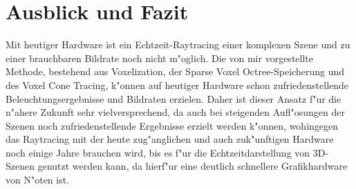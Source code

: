 \documentclass[a4paper, 12pt]{scrartcl}
\begin{document}
\section{Ausblick und Fazit}
Mit heutiger Hardware ist ein Echtzeit-Raytracing einer komplexen Szene und zu einer brauchbaren Bildrate noch nicht m"oglich. Die von mir vorgestellte Methode, bestehend aus Voxelization, der Sparse Voxel Octree-Speicherung und des Voxel Cone Tracing, k"onnen auf heutiger Hardware schon zufriedenstellende Beleuchtungsergebnisse und Bildraten erzielen. 
Daher ist dieser Ansatz f"ur die n"ahere Zukunft sehr vielversprechend, da auch bei steigenden Aufl"osungen der Szenen noch zufriedenstellende Ergebnisse erzielt werden k"onnen, wohingegen das Raytracing mit der heute zug"anglichen und auch zuk"unftigen Hardware noch einige Jahre brauchen wird, bis es f"ur die Echtzeitdarstellung von 3D-Szenen genutzt werden kann, da hierf"ur eine deutlich schnellere Grafikhardware von N"oten ist.
\end{document}
